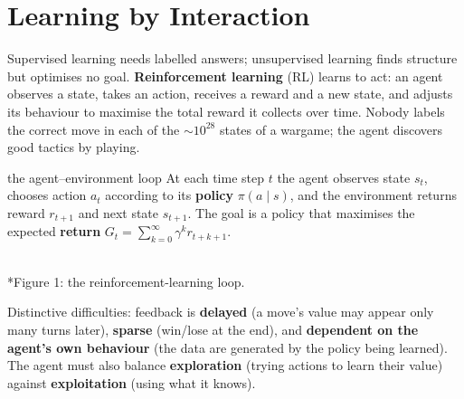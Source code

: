 \documentclass[11pt]{article}
\begin{document}
\tableofcontents
\newpage

\section{Learning by Interaction}
Supervised learning needs labelled answers; unsupervised learning finds structure but optimises no goal. \textbf{Reinforcement learning} (RL) learns to act: an agent observes a state, takes an action, receives a reward and a new state, and adjusts its behaviour to maximise the total reward it collects over time. Nobody labels the correct move in each of the $\sim10^{28}$ states of a wargame; the agent discovers good tactics by playing.
\begin{definition}{the agent--environment loop}
At each time step $t$ the agent observes state $s_t$, chooses action $a_t$ according to its \textbf{policy} $\pi(a\mid s)$, and the environment returns reward $r_{t+1}$ and next state $s_{t+1}$. The goal is a policy that maximises the expected \textbf{return} $G_t=\sum_{k=0}^\infty\gamma^kr_{t+k+1}$.
\end{definition}
\begin{center}\\*{\small\color{GreyN}Figure 1: the reinforcement-learning loop.}\end{center}
Distinctive difficulties: feedback is \textbf{delayed} (a move's value may appear only many turns later), \textbf{sparse} (win/lose at the end), and \textbf{dependent on the agent's own behaviour} (the data are generated by the policy being learned). The agent must also balance \textbf{exploration} (trying actions to learn their value) against \textbf{exploitation} (using what it knows).
\end{document}

